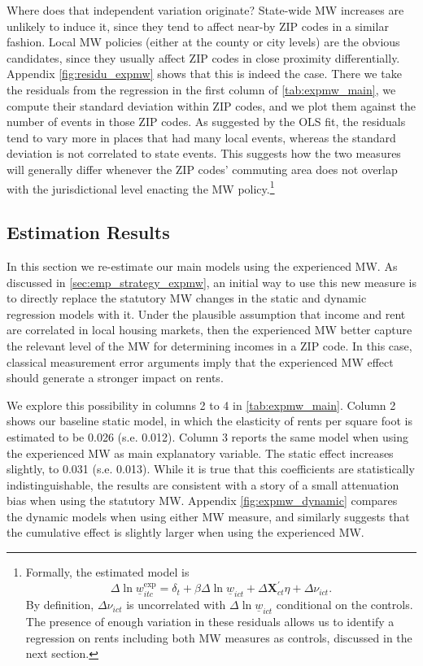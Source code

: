 Where does that independent variation originate? State-wide MW increases are unlikely to 
induce it, since they tend to affect near-by ZIP codes in a similar fashion. Local MW policies 
(either at the county or city levels) are the obvious candidates, since they usually affect 
ZIP codes in close proximity differentially. Appendix \autoref{fig:residu_expmw} shows that 
this is indeed the case. There we take the residuals from the regression in the first column 
of \autoref{tab:expmw_main}, we compute their standard deviation within ZIP codes, and we plot 
them against the number of events in those ZIP codes. As suggested by the OLS fit, the residuals
tend to vary more in places that had many local events, whereas the standard deviation is not 
correlated to state events. This suggests how the two measures will generally differ whenever the 
ZIP codes' commuting area does not overlap with the jurisdictional level enacting the MW 
policy.\footnote{Formally, the estimated model is 
	$$ \Delta \ln \underline{w}_{itc}^{\text{exp}} = \delta_t 
				+ \beta \Delta \ln \underline{w}_{ict} + \Delta \mathbf{X}^{'}_{ct} \eta 
				+ \Delta \nu_{ict} . $$
	By definition, $\Delta \nu_{ict}$ is uncorrelated with $\Delta \ln \underline{w}_{ict}$ 
	conditional on the controls. The presence of enough variation in these residuals allows us
	to identify a regression on rents including both MW measures as controls, discussed in the
	next section.}


\subsection{Estimation Results}

In this section we re-estimate our main models using the experienced MW. As discussed in 
\autoref{sec:emp_strategy_expmw}, an initial way to use this new measure is to directly
replace the statutory MW changes in the static and dynamic regression models with it. 
Under the plausible assumption that income and rent are correlated in local housing 
markets, then the experienced MW better capture the relevant level of the MW for 
determining incomes in a ZIP code. In this case, classical measurement error arguments 
imply that the experienced MW effect should generate a stronger impact on rents. 

We explore this possibility in columns 2 to 4 in \autoref{tab:expmw_main}. Column 2 
shows our baseline static model, in which the elasticity of rents per square foot is 
estimated to be 0.026 (s.e. 0.012). Column 3 reports the same model when using the 
experienced MW as main explanatory variable. The static effect increases slightly, to 
0.031 (s.e. 0.013). While it is true that this coefficients are statistically 
indistinguishable, the results are consistent with a story of a small attenuation bias 
when using the statutory MW. Appendix \autoref{fig:expmw_dynamic} compares the dynamic 
models when using either MW measure, and similarly suggests that the cumulative effect 
is slightly larger when using the experienced MW.


